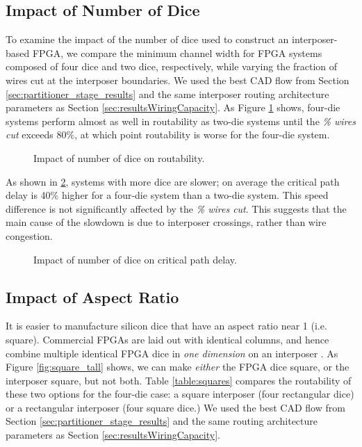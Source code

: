 \documentclass[journal]{IEEEtran}
\begin{document}
\subsection{Impact of Number of Dice}
\label{num_dice_impact}
To examine the impact of the number of dice used to construct an interposer-based FPGA, we compare the minimum channel width for FPGA systems composed of four dice and two dice, respectively, while varying the fraction of wires cut at the interposer boundaries. We used the best CAD flow from Section \ref{sec:partitioner_stage_results} and the same interposer routing architecture parameters as Section \ref{sec:resultsWiringCapacity}. 
As Figure \ref{fig:wires_cut_4part} shows, four-die systems perform almost as well in routability as two-die systems until the \textit{\% wires cut} exceeds 80\%, at which point routability is worse for the four-die system. 

\begin{figure}[!htbp]
\centering

\caption{Impact of number of dice on routability.}
\label{fig:wires_cut_4part}
\end{figure}

As shown in \ref{fig:crit_path_4part}, systems with more dice are slower; on average the critical path delay is 40\% higher for a four-die system than a two-die system. This speed difference is not significantly affected by the \textit{\% wires cut}. This suggests that the main cause of the slowdown is due to interposer crossings, rather than wire congestion.
\begin{figure}[!htbp]
\centering

\caption{Impact of number of dice on critical path delay.}
\label{fig:crit_path_4part}
\end{figure}

\subsection{Impact of Aspect Ratio}
\label{aspect_ratio_impact}
It is easier to manufacture silicon dice that have an aspect ratio near 1 (i.e. square). Commercial FPGAs are laid out with identical columns, and hence combine multiple identical FPGA dice in \textit{one dimension} on an interposer \cite{xilinxTSV}. As Figure \ref{fig:square_tall} shows, we can make \textit{either} the FPGA dice square, or the interposer square, but not both. Table \ref{table:squares} compares the routability of these two options for the four-die case: a square interposer (four rectangular dice) or a rectangular interposer (four square dice.) We used the best CAD flow from Section \ref{sec:partitioner_stage_results} and the same routing architecture parameters as Section \ref{sec:resultsWiringCapacity}. 
\end{document}
